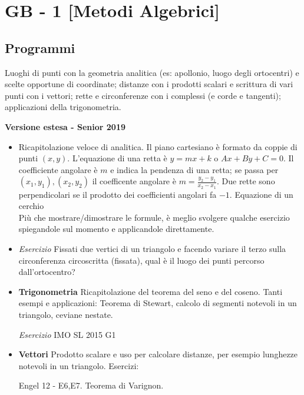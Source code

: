 \section{GB - 1 [Metodi Algebrici]}
\subsection{Programmi}
\begin{short}
 Luoghi di punti con la geometria analitica (es: apollonio, luogo degli ortocentri) e scelte opportune di coordinate; distanze con i prodotti scalari e scrittura di vari punti con i vettori; rette e circonferenze con i complessi (e corde e tangenti); applicazioni della trigonometria.
\end{short}



\vspace{0.3cm}
\large{\textbf{Versione estesa - Senior 2019}}\normalsize
\begin{itemize}
 \item Ricapitolazione veloce di analitica. Il piano cartesiano è formato da coppie di punti $(x,y)$. L'equazione di una retta è $y=mx+k$ o $Ax+By+C=0$. Il coefficiente angolare è $m$ e indica la pendenza di una retta; se passa per $(x_1,y_1),(x_2,y_2)$ il coefficente angolare è $m=\frac{y_2-y_1}{x_2-x_1}$. Due rette sono perpendicolari se il prodotto dei coefficienti angolari fa $-1$. Equazione di un cerchio\\
 Più che mostrare/dimostrare le formule, è meglio svolgere qualche esercizio spiegandole sul momento e applicandole direttamente.

\item \emph{Esercizio} Fissati due vertici di un triangolo e facendo variare il terzo sulla circonferenza circoscritta (fissata), qual è il luogo dei punti percorso dall'ortocentro?



\item \textbf{Trigonometria} Ricapitolazione del teorema del seno e del coseno. Tanti esempi e applicazioni: Teorema di Stewart, calcolo di segmenti notevoli in un triangolo, ceviane nestate. 

\emph{Esercizio} IMO SL 2015 G1


\item \textbf{Vettori} Prodotto scalare e uso per calcolare distanze, per esempio lunghezze notevoli in un triangolo. Esercizi:

Engel 12 - E6,E7. Teorema di Varignon.


\end{itemize}
